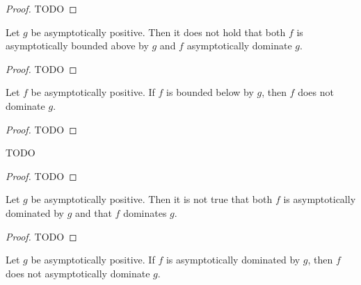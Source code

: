 \begin{proof}
    \leanok
    TODO 
\end{proof}

\begin{lemma}
    \label{lemma:not_asymp_pos_bounded_above_and_left_dom}
    \leanok
    Let $g$ be asymptotically positive. Then it does not hold that both $f$ is asymptotically 
    bounded above by $g$ and $f$ asymptotically dominate $g$.
\end{lemma}

\begin{proof}
    \leanok
    TODO 
\end{proof}

\begin{theorem}
    \label{thm:asymp_pos_bounded_above_imp_not_left_dom}
    \leanok
    Let $f$ be asymptotically positive. If $f$ is bounded below by $g$, then $f$ 
    does not dominate $g$.
\end{theorem}

\begin{proof}
    TODO 
\end{proof}

\begin{theorem}
    \label{thm:asymp_pos_left_dom_imp_not_bounded_above}
    \leanok
    TODO
\end{theorem}

\begin{proof}
    TODO 
\end{proof}

\begin{theorem}
    \label{thm:not_asymp_pos_left_and_right_dom}
    \leanok
    Let $g$ be asymptotically positive. Then it is not true that both $f$ is asymptotically
    dominated by $g$ and that $f$ dominates $g$.
\end{theorem}

\begin{proof}
    TODO 
\end{proof}

\begin{theorem}
    \label{thm:not_asymp_pos_left_dom_of_right_dom}
    \leanok
    Let $g$ be asymptotically positive. If $f$ is asymptotically dominated by $g$, then
    $f$ does not asymptotically dominate $g$.
\end{theorem}

